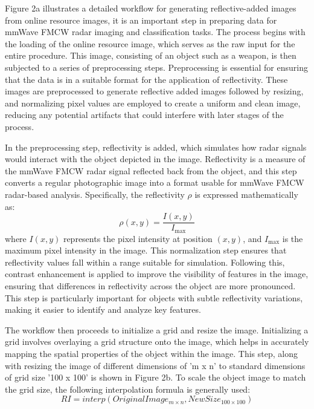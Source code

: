 \documentclass[journal,article,submit,pdftex,moreauthors]{Definitions/mdpi}
\begin{document}
Figure 2a illustrates a detailed workflow for generating reflective-added images from online resource images, it is an important step in preparing data for mmWave FMCW radar imaging and classification tasks. The process begins with the loading of the online resource image, which serves as the raw input for the entire procedure. This image, consisting of an object such as a weapon, is then subjected to a series of preprocessing steps. Preprocessing is essential for ensuring that the data is in a suitable format for the application of reflectivity. These images are preprocessed to generate reflective added images followed by resizing, and normalizing pixel values are employed to create a uniform and clean image, reducing any potential artifacts that could interfere with later stages of the process. 



 In the preprocessing step, reflectivity is added, which simulates how radar signals would interact with the object depicted in the image. Reflectivity is a measure of the mmWave FMCW radar signal reflected back from the object, and this step converts a regular photographic image into a format usable for mmWave FMCW radar-based analysis. Specifically, the reflectivity \(\rho\) is expressed mathematically as:
 \begin{equation}
\rho(x, y) = \frac{I(x, y)}{I_{\text{max}}}
 \end{equation}
where \(I(x, y)\) represents the pixel intensity at position \((x, y)\), and \(I_{\text{max}}\) is the maximum pixel intensity in the image. This normalization step ensures that reflectivity values fall within a range suitable for simulation. Following this, contrast enhancement is applied to improve the visibility of features in the image, ensuring that differences in reflectivity across the object are more pronounced. This step is particularly important for objects with subtle reflectivity variations, making it easier to identify and analyze key features.


The workflow then proceeds to initialize a grid and resize the image. Initializing a grid involves overlaying a grid structure onto the image, which helps in accurately mapping the spatial properties of the object within the image. This step, along with resizing the image of different dimensions of 'm x n' to standard dimensions of grid size '100 x 100' is shown in Figure 2b. To scale the object image to match the grid size, the following interpolation formula is generally used:
 \begin{equation}
     RI=interp(Original Image_{{m \times n}},New Size_{100 \times 100})
 \end{equation}
\end{document}
